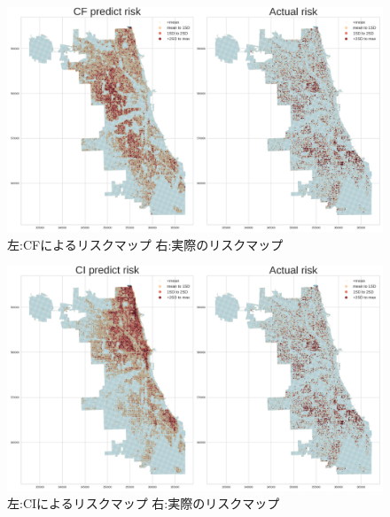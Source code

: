 \begin{figure}[H]
  \centering %
  \includegraphics[scale=0.15]{./non-crime-timeseries-fig/CF_riskmap.png}
  \caption{左:CFによるリスクマップ 右:実際のリスクマップ}
  \label{fig:non-crime-timeseries-cf-risk}
\end{figure}

\begin{figure}[H]
  \centering %
  \includegraphics[scale=0.15]{./non-crime-timeseries-fig/CI_riskmap.png}
  \caption{左:CIによるリスクマップ 右:実際のリスクマップ}
  \label{fig:non-crime-timeseries-ci-risk}
\end{figure}


